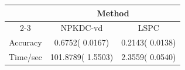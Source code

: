\begin{tabular}{ccc}\hline
 & \multicolumn{2}{c}{Method} \\ \cline{2-3} 
 & NPKDC-vd & LSPC \\ \hline 
Accuracy &   0.6752(  0.0167) &   0.2143(  0.0138) \\ \hline 
Time/sec & 101.8789(  1.5503) &   2.3559(  0.0540) \\ \hline 
\end{tabular}
